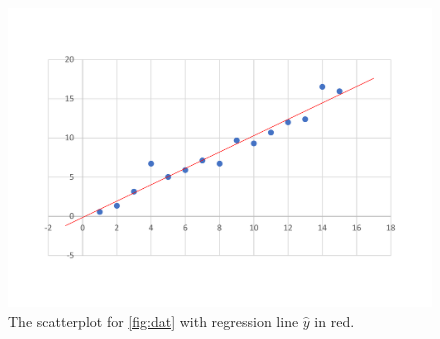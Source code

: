 \documentclass[10pt,a4paper, twocolumn, conference]{IEEEtran}
\begin{document}
\pagebreak
\onecolumn
\begin{figure}[H]
\centering
\includegraphics[width = 1.0\textwidth]{data_graphmain}
\caption{The scatterplot for \cref{fig:dat} with regression line $\hat{y}$ in red.}
\label{fig:main}
\end{figure}
\end{document}
